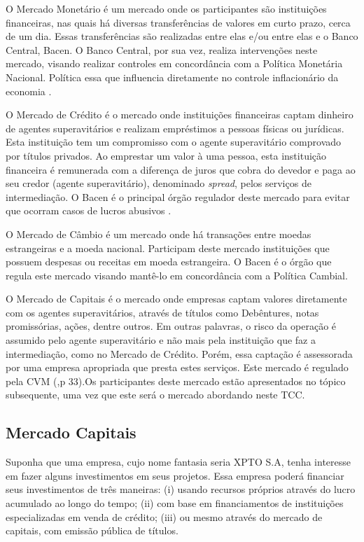 O Mercado Monetário é um mercado onde os participantes são instituições financeiras, nas quais há diversas transferências de valores em curto prazo, cerca de um dia. Essas transferências são realizadas entre elas e/ou entre elas e o Banco Central, Bacen. O Banco Central, por sua vez, realiza intervenções neste mercado, visando realizar controles em concordância com a Política Monetária Nacional. Política essa que influencia diretamente no controle inflacionário da economia \cite[p. 32]{cmv2014}.

O Mercado de Crédito é o mercado onde instituições financeiras captam dinheiro de agentes superavitários e realizam empréstimos a pessoas físicas ou jurídicas. Esta instituição tem um compromisso com o agente superavitário comprovado por títulos privados. Ao emprestar um valor à uma pessoa, esta instituição financeira é remunerada com a diferença de juros que cobra do devedor e paga ao seu credor (agente superavitário), denominado \textit{spread}, pelos serviços de intermediação. O Bacen é o principal órgão regulador deste mercado para evitar que ocorram casos de lucros abusivos \cite[p. 32]{cmv2014}.

O Mercado de Câmbio é um mercado onde há transações entre moedas estrangeiras e a moeda nacional. Participam deste mercado instituições que possuem despesas ou receitas em moeda estrangeira. O Bacen é o órgão que regula este mercado visando mantê-lo em concordância com a Política Cambial\cite[p. 32]{cmv2014}.

O Mercado de Capitais é o mercado onde empresas captam valores diretamente com os agentes superavitários, através de títulos como Debêntures, notas promissórias, ações, dentre outros. Em outras palavras, o risco da operação é assumido pelo agente superavitário e não mais pela instituição que faz a intermediação, como no Mercado de Crédito. Porém, essa captação é assessorada por uma empresa apropriada que presta estes serviços. Este mercado é regulado pela CVM (\citeyear{cmv2014},p 33).Os participantes deste mercado estão apresentados no tópico subsequente, uma vez que este será o mercado abordando neste TCC.

\subsection{Mercado Capitais}

Suponha que uma empresa, cujo nome fantasia seria XPTO S.A, tenha interesse em fazer alguns investimentos em seus projetos. Essa empresa poderá financiar seus investimentos de três maneiras: (i) usando recursos próprios através do lucro acumulado ao longo do tempo; (ii) com base em financiamentos de instituições especializadas em venda de crédito; (iii) ou mesmo através do mercado de capitais, com emissão pública de títulos.
	
